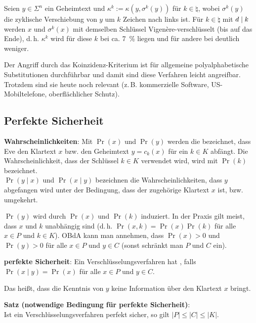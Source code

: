 Seien $y \in \Sigma^n$ ein Geheimtext und $\kappa^k := \kappa(y, \sigma^k(y))$ für
$k \in \natural$, wobei $\sigma^k(y)$ die zyklische Verschiebung von $y$ um $k$ Zeichen nach links
ist.
Für $k \in \natural$ mit $d \mid k$ werden $x$ und $\sigma^k(x)$ mit demselben Schlüssel
Vigenère-verschlüsselt (bis auf das Ende), d.\,h. $\kappa^k$ wird für diese $k$ bei
ca. \SI{7}{\percent} liegen und für andere bei deutlich weniger.

Der Angriff durch das Koinzidenz-Kriterium ist für allgemeine polyalphabetische Substitutionen
durchführbar und damit sind diese Verfahren leicht angreifbar.
Trotzdem sind sie heute noch relevant
(z.\,B. kommerzielle Software, US-Mobiltelefone, oberflächlicher Schutz).

\pagebreak

\subsection{%
    Perfekte Sicherheit%
}

\textbf{Wahrscheinlichkeiten}:
Mit $\Pr(x)$ und $\Pr(y)$ werden die  bezeichnet,
dass Eve den Klartext $x$ bzw. den Geheimtext $y = c_k(x)$ für ein $k \in K$ abfängt.
Die Wahrscheinlichkeit, dass der Schlüssel $k \in K$ verwendet wird, wird mit $\Pr(k)$
bezeichnet.\\
$\Pr(y \;|\; x)$ und $\Pr(x \;|\; y)$ bezeichnen die Wahrscheinlichkeiten, dass $y$ abgefangen
wird unter der Bedingung, dass der zugehörige Klartext $x$ ist, bzw. umgekehrt.

$\Pr(y)$ wird durch $\Pr(x)$ und $\Pr(k)$ induziert.
In der Praxis gilt meist, dass $x$ und $k$ unabhängig sind (d.\,h. $\Pr(x, k) = \Pr(x) \Pr(k)$
für alle $x \in P$ und $k \in K$).
OBdA kann man annehmen, dass $\Pr(x) > 0$ und $\Pr(y) > 0$ für alle
$x \in P$ und $y \in C$ (sonst schränkt man $P$ und $C$ ein).

\textbf{perfekte Sicherheit}:
Ein Verschlüsselungsverfahren hat , falls\\
$\Pr(x \;|\; y) = \Pr(x)$ für alle $x \in P$ und $y \in C$.

Das heißt, dass die Kenntnis von $y$ keine Information über den Klartext $x$ bringt.

\linie

\textbf{Satz (notwendige Bedingung für perfekte Sicherheit)}:\\
Ist ein Verschlüsselungsverfahren perfekt sicher, so gilt
$|P| \le |C| \le |K|$.

